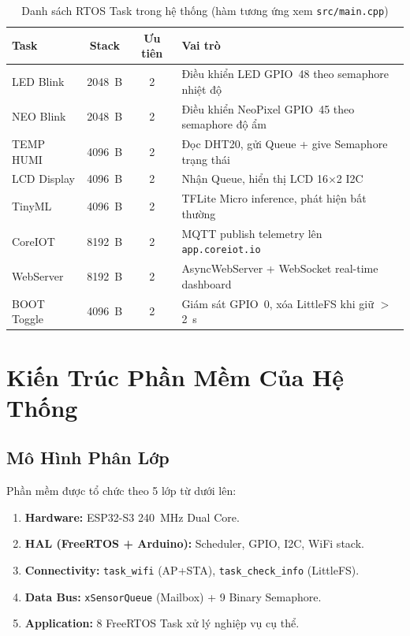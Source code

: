 \documentclass[12pt,a4paper]{article}
\begin{document}
\begin{table}[H]
\centering
\begin{tabular}{|p{2.8cm}|c|c|p{6.5cm}|}
\hline
\textbf{Task} & \textbf{Stack} & \textbf{Ưu tiên} & \textbf{Vai trò} \\
\hline
LED Blink       & 2048~B & 2 & Điều khiển LED GPIO~48 theo semaphore nhiệt độ \\
NEO Blink       & 2048~B & 2 & Điều khiển NeoPixel GPIO~45 theo semaphore độ ẩm \\
TEMP HUMI       & 4096~B & 2 & Đọc DHT20, gửi Queue + give Semaphore trạng thái \\
LCD Display     & 4096~B & 2 & Nhận Queue, hiển thị LCD 16×2 I2C \\
TinyML          & 4096~B & 2 & TFLite Micro inference, phát hiện bất thường \\
CoreIOT         & 8192~B & 2 & MQTT publish telemetry lên \texttt{app.coreiot.io} \\
WebServer       & 8192~B & 2 & AsyncWebServer + WebSocket real-time dashboard \\
BOOT Toggle     & 4096~B & 2 & Giám sát GPIO~0, xóa LittleFS khi giữ $>$2~s \\
\hline
\end{tabular}
\caption{Danh sách RTOS Task trong hệ thống (hàm tương ứng xem \texttt{src/main.cpp})}
\end{table}


\section{Kiến Trúc Phần Mềm Của Hệ Thống}

\subsection{Mô Hình Phân Lớp}

Phần mềm được tổ chức theo 5 lớp từ dưới lên:

\begin{enumerate}
    \item \textbf{Hardware:} ESP32-S3 240~MHz Dual Core.
    \item \textbf{HAL (FreeRTOS + Arduino):} Scheduler, GPIO, I2C, WiFi stack.
    \item \textbf{Connectivity:} \texttt{task\_wifi} (AP+STA), \texttt{task\_check\_info} (LittleFS).
    \item \textbf{Data Bus:} \texttt{xSensorQueue} (Mailbox) + 9 Binary Semaphore.
    \item \textbf{Application:} 8 FreeRTOS Task xử lý nghiệp vụ cụ thể.
\end{enumerate}
\end{document}
